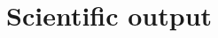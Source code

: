 \documentclass[11pt,a4paper,sans]{moderncv}
\begin{document}




\section{Scientific output}
\end{document}
